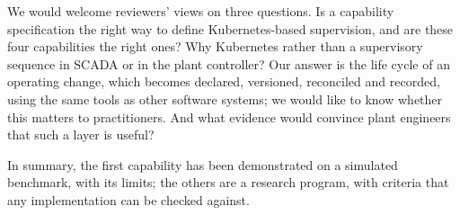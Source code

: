 \documentclass[conference]{IEEEtran}
\begin{document}
We would welcome reviewers' views on three questions. Is a capability specification the right way to define Kubernetes-based supervision, and are these four capabilities the right ones? Why Kubernetes rather than a supervisory sequence in SCADA or in the plant controller? Our answer is the life cycle of an operating change, which becomes declared, versioned, reconciled and recorded, using the same tools as other software systems; we would like to know whether this matters to practitioners. And what evidence would convince plant engineers that such a layer is useful?

In summary, the first capability has been demonstrated on a simulated benchmark, with its limits; the others are a research program, with criteria that any implementation can be checked against.



\end{document}
